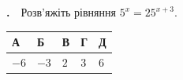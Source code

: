 \documentclass[12pt]{article}
\renewcommand{\headrulewidth}{0.4pt}
\renewcommand{\footrulewidth}{0.4pt}
\newlength{\nmtcellw}
\newcommand{\nmtSetCell}{\setlength{\nmtcellw}{\dimexpr(\linewidth-10\tabcolsep-6\arrayrulewidth)/5\relax}}
\newcommand{\answerTable}[5]{%
\par\nopagebreak\vspace{0.15cm}
\noindent\nmtSetCell
\begin{tabular}{|*{5}{>{\centering\arraybackslash}m{\nmtcellw}|}}
\hline
\rule[-0.15cm]{0pt}{0.6cm}\textbf{А} & \rule[-0.15cm]{0pt}{0.6cm}\textbf{Б} & \rule[-0.15cm]{0pt}{0.6cm}\textbf{В} & \rule[-0.15cm]{0pt}{0.6cm}\textbf{Г} & \rule[-0.15cm]{0pt}{0.6cm}\textbf{Д} \\
\hline
\rule[-0.2cm]{0pt}{0.75cm}#1 & \rule[-0.2cm]{0pt}{0.75cm}#2 & \rule[-0.2cm]{0pt}{0.75cm}#3 & \rule[-0.2cm]{0pt}{0.75cm}#4 & \rule[-0.2cm]{0pt}{0.75cm}#5 \\
\hline
\end{tabular}
\par\vspace{0.25cm}
}
\newcounter{zad}
\newcommand{\zadtask}[1]{\stepcounter{zad}\noindent\textbf{\thezad.}\ \ #1\par\nopagebreak\vspace{0.2cm}}
\newcounter{ans}
\begin{document}
\begin{samepage}
\zadtask{Розв'яжіть рівняння $5^{x} = 25^{x+3}$.}
\answerTable{$-6$}{$-3$}{$2$}{$3$}{$6$}
\par{}
\end{samepage}

\begingroup
\providecommand{\matchingLayout}{}\renewcommand{\matchingLayout}[3]{
    \noindent
    \begin{minipage}[t]{0.36\textwidth}\vspace{0pt}\raggedright
       
        #1
    \end{minipage}%
    \hfill
    \begin{minipage}[t]{0.43\textwidth}\vspace{0pt}\raggedright
        
        #2
    \end{minipage}%
    \hfill
    \begin{minipage}[t]{0.19\textwidth}\vspace{0pt}\raggedright
        \vspace{0pt} %
        \begin{flushright}
        #3
        \end{flushright}
    \end{minipage}
}

\renewcommand{\headrulewidth}{0.4pt}
\renewcommand{\footrulewidth}{0.4pt}
\end{document}

